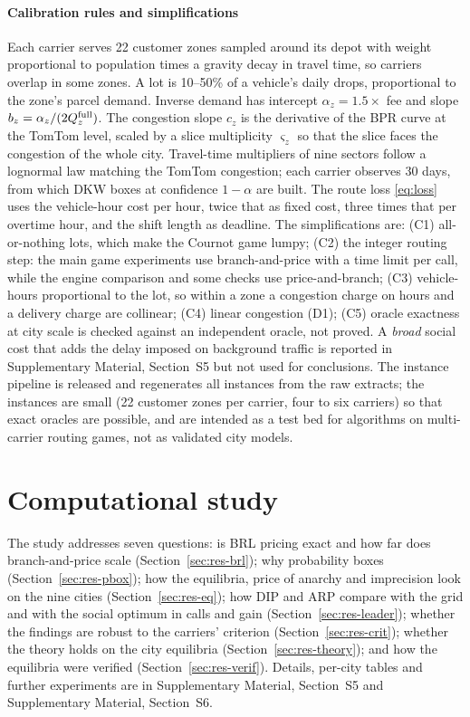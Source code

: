 \documentclass[preprint,11pt]{elsarticle}
\theoremstyle{definition}
\theoremstyle{remark}
\newcommand{\SM}[1]{Supplementary Material, Section~#1}
\begin{document}
\paragraph{Calibration rules and simplifications} Each carrier serves 22 customer zones sampled around its depot with weight proportional to population times a gravity decay in travel time, so carriers overlap in some zones. A lot is 10--50\% of a vehicle's daily drops, proportional to the zone's parcel demand. Inverse demand has intercept $\alpha_z=1.5\times$ fee and slope $b_z=\alpha_z/(2Q_z^{\rm full})$. The congestion slope $c_z$ is the derivative of the BPR curve at the TomTom level, scaled by a slice multiplicity $\varsigma_z$ so that the slice faces the congestion of the whole city. Travel-time multipliers of nine sectors follow a lognormal law matching the TomTom congestion; each carrier observes 30 days, from which DKW boxes at confidence $1-\alpha$ are built. The route loss \eqref{eq:loss} uses the vehicle-hour cost per hour, twice that as fixed cost, three times that per overtime hour, and the shift length as deadline. The simplifications are:
(C1) all-or-nothing lots, which make the Cournot game lumpy; (C2) the integer routing step: the main game experiments use branch-and-price with a time limit per call, while the engine comparison and some checks use price-and-branch; (C3) vehicle-hours proportional to the lot, so within a zone a congestion charge on hours and a delivery charge are collinear; (C4) linear congestion (D1); (C5) oracle exactness at city scale is checked against an independent oracle, not proved. A \emph{broad} social cost that adds the delay imposed on background traffic is reported in \SM{S5} but not used for conclusions. The instance pipeline is released and regenerates all instances from the raw extracts; the instances are small (22 customer zones per carrier, four to six carriers) so that exact oracles are possible, and are intended as a test bed for algorithms on multi-carrier routing games, not as validated city models.

\section{Computational study}\label{sec:results}

The study addresses seven questions: is BRL pricing exact and how far does branch-and-price scale (Section~\ref{sec:res-brl}); why probability boxes (Section~\ref{sec:res-pbox}); how the equilibria, price of anarchy and imprecision look on the nine cities (Section~\ref{sec:res-eq}); how DIP and ARP compare with the grid and with the social optimum in calls and gain (Section~\ref{sec:res-leader}); whether the findings are robust to the carriers' criterion (Section~\ref{sec:res-crit}); whether the theory holds on the city equilibria (Section~\ref{sec:res-theory}); and how the equilibria were verified (Section~\ref{sec:res-verif}). Details, per-city tables and further experiments are in \SM{S5} and \SM{S6}.
\end{document}
